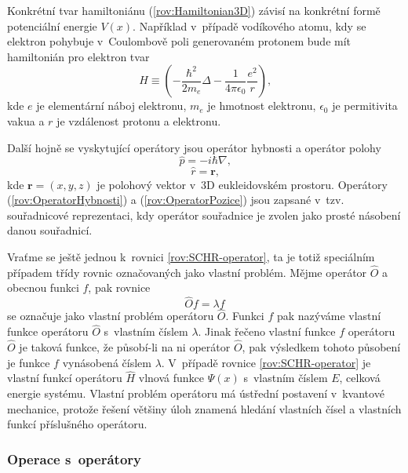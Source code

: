 Konkrétní tvar hamiltoniánu (\ref{rov:Hamiltonian3D}) závisí na konkrétní formě potenciální energie $V(x)$. Například v~případě vodíkového atomu, kdy se elektron pohybuje v~Coulombově poli generovaném protonem bude mít hamiltonián pro elektron tvar
\begin{equation}
\hat{H} \equiv \left( -\frac{\hbar^2}{2m_e}\Delta - \frac{1}{4 \pi \epsilon_0}\frac{e^2}{r} \right) \mbox{,}
\label{rov:HamiltonianVodik}
\end{equation}
kde $e$ je elementární náboj elektronu, $m_e$ je hmotnost elektronu, $\epsilon_0$ je permitivita vakua a $r$ je vzdálenost protonu a elektronu.

Další hojně se vyskytující operátory jsou operátor hybnosti a operátor polohy
\begin{equation}
\hat{p}= -i\hbar \nabla \mbox{,}
\label{rov:OperatorHybnosti}
\end{equation}
\begin{equation}
\hat{r} = \mathbf{r} \mbox{,}
\label{rov:OperatorPozice}
\end{equation}
kde $\mathbf{r}=(x,y,z)$ je polohový vektor v~3D eukleidovském prostoru. Operátory (\ref{rov:OperatorHybnosti}) a (\ref{rov:OperatorPozice}) jsou zapsané v~tzv. souřadnicové reprezentaci, kdy operátor souřadnice je zvolen jako prosté násobení danou souřadnicí.

Vraťme se ještě jednou k~rovnici \eqref{rov:SCHR-operator}, ta je totiž speciálním případem třídy rovnic označovaných jako vlastní problém. Mějme operátor $\hat{O}$ a obecnou funkci $f$, pak rovnice
\begin{equation}
\boxed{\hat{O} f = \lambda f}
\label{rov:VlastniProblem}
\end{equation}
se označuje jako vlastní problém operátoru $\hat{O}$. Funkci $f$ pak nazýváme vlastní funkce operátoru $\hat{O}$ s~vlastním číslem $\lambda$. Jinak řečeno vlastní funkce $f$ operátoru $\hat{O}$ je taková funkce, že působí-li na ni operátor $\hat{O}$, pak výsledkem tohoto působení je funkce $f$ vynásobená číslem $\lambda$. V~případě rovnice \eqref{rov:SCHR-operator} je vlastní funkcí operátoru $\hat{H}$ vlnová funkce $\Psi(x)$ s~vlastním číslem $E$, celková energie systému. Vlastní problém operátoru má ústřední postavení v~kvantové mechanice, protože řešení většiny úloh znamená hledání vlastních čísel a vlastních funkcí příslušného operátoru. 



\subsubsection{Operace s~operátory}
\label{kap:OperaceSOperatory}

